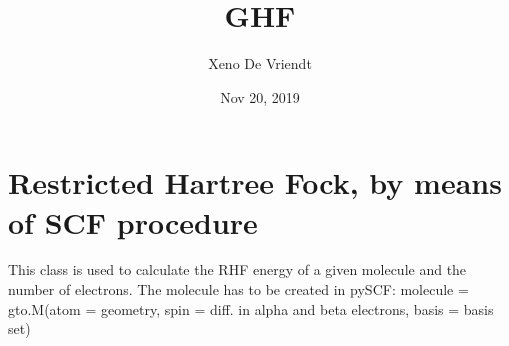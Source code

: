 \documentclass[letterpaper,10pt,english]{sphinxmanual}
\title{GHF}
\date{Nov 20, 2019}
\author{Xeno De Vriendt}
\begin{document}
\pagestyle{empty}
\sphinxmaketitle
\pagestyle{plain}
\sphinxtableofcontents
\pagestyle{normal}
\label{\detokenize{index::doc}}

\label{\detokenize{RHF:module-ghf.RHF}}

\chapter{Restricted Hartree Fock, by means of SCF procedure}
\label{\detokenize{RHF:restricted-hartree-fock-by-means-of-scf-procedure}}\label{\detokenize{RHF::doc}}
This class is used to calculate the RHF energy of a given molecule and the number of electrons.
The molecule has to be created in pySCF:
molecule = gto.M(atom = geometry, spin = diff. in alpha and beta electrons, basis = basis set)
\end{document}
